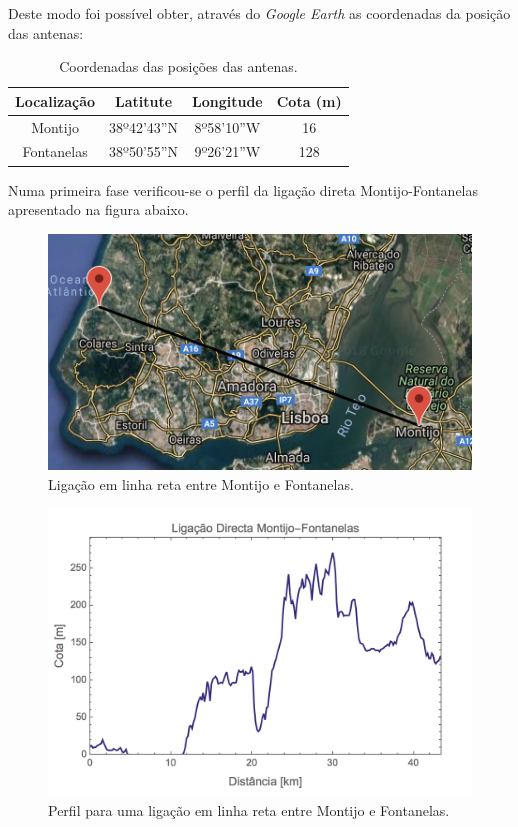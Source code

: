 Deste modo foi possível obter, através do \textit{Google Earth} as coordenadas da posição das antenas:
\begin{table}[H]
\centering
\begin{tabular}{|c|c|c|c|}
\hline
Localização & Latitute & Longitude & Cota (m)\\
\hline
Montijo & 38º42'43''N & 8º58'10''W & 16\\
Fontanelas & 38º50'55''N & 9º26'21''W & 128\\
\hline
\end{tabular}
\caption{Coordenadas das posições das antenas.}
\label{coord}
\end{table}

Numa primeira fase verificou-se o perfil da ligação direta Montijo-Fontanelas apresentado na figura abaixo.
\begin{figure}[H]
\includegraphics[scale=0.5]{Ligac_a_o_direta_Fontanelas-Montijo.png}
\centering
\caption{Ligação em linha reta entre Montijo e Fontanelas.}
\end{figure}
\begin{figure}[H]
\includegraphics[scale=0.5]{perfil_d.png}
\centering
\caption{Perfil para uma ligação em linha reta entre Montijo e Fontanelas.}
\end{figure}

